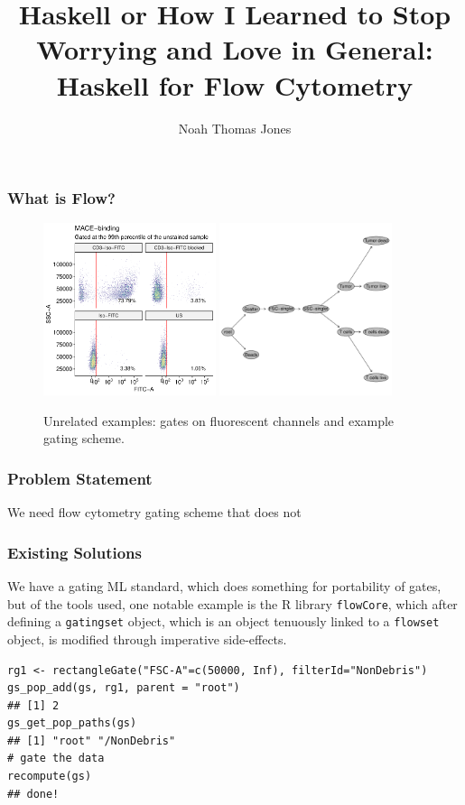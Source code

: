 \documentclass{beamer}
\title{Haskell or How I Learned to Stop Worrying and Love in General: Haskell for Flow Cytometry}
\author{Noah Thomas Jones}
\institute{University of Florida}
\date{}
\begin{document}
\frame{\titlepage}
\begin{frame}
  \frametitle{What is Flow?}
  \begin{figure}
    \centering
    \includegraphics[width=0.45\textwidth]{./images/NJ030_MACE-binding.pdf}
    \includegraphics[width=0.45\textwidth]{./images/NJ017_gates.pdf}
    \caption{Unrelated examples: gates on fluorescent channels and
      example gating scheme.}
  \end{figure}
\end{frame}
\begin{frame}
  \frametitle{Problem Statement}
  We need flow cytometry gating scheme that does not
\end{frame}
\begin{frame}[fragile]
  \frametitle{Existing Solutions} We have a gating ML
  standard\cite{spidlen2015isac}, which does something for portability
  of gates, but of the tools used, one notable example is the R
  library \texttt{flowCore}, which after defining a \texttt{gatingset} object,
  which is an object tenuously linked to a \texttt{flowset} object, is
  modified through imperative side-effects.
\begin{lstlisting}
rg1 <- rectangleGate("FSC-A"=c(50000, Inf), filterId="NonDebris")
gs_pop_add(gs, rg1, parent = "root")
## [1] 2
gs_get_pop_paths(gs)
## [1] "root" "/NonDebris"
# gate the data
recompute(gs)
## done!
\end{lstlisting}
\end{frame}
\end{document}
